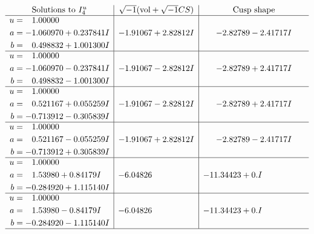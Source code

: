 \documentclass[1p]{elsarticle_modified}
\theoremstyle{definition}
\newcommand{\I}{\sqrt{-1}}
\begin{document}
$$\begin{array}{c|c|c}  
\text{Solutions to }I^u_{4}& \I (\text{vol} + \sqrt{-1}CS) & \text{Cusp shape}\\
 \hline 
\begin{aligned}
u &= \phantom{-}1.00000\phantom{ +0.000000I} \\
a &= -1.060970 + 0.237841 I \\
b &= \phantom{-}0.498832 + 1.001300 I\end{aligned}
 & -1.91067 + 2.82812 I & -2.82789 - 2.41717 I \\ \hline\begin{aligned}
u &= \phantom{-}1.00000\phantom{ +0.000000I} \\
a &= -1.060970 - 0.237841 I \\
b &= \phantom{-}0.498832 - 1.001300 I\end{aligned}
 & -1.91067 - 2.82812 I & -2.82789 + 2.41717 I \\ \hline\begin{aligned}
u &= \phantom{-}1.00000\phantom{ +0.000000I} \\
a &= \phantom{-}0.521167 + 0.055259 I \\
b &= -0.713912 - 0.305839 I\end{aligned}
 & -1.91067 - 2.82812 I & -2.82789 + 2.41717 I \\ \hline\begin{aligned}
u &= \phantom{-}1.00000\phantom{ +0.000000I} \\
a &= \phantom{-}0.521167 - 0.055259 I \\
b &= -0.713912 + 0.305839 I\end{aligned}
 & -1.91067 + 2.82812 I & -2.82789 - 2.41717 I \\ \hline\begin{aligned}
u &= \phantom{-}1.00000\phantom{ +0.000000I} \\
a &= \phantom{-}1.53980 + 0.84179 I \\
b &= -0.284920 + 1.115140 I\end{aligned}
 & -6.04826\phantom{ +0.000000I} & -11.34423 + 0. I\phantom{ +0.000000I} \\ \hline\begin{aligned}
u &= \phantom{-}1.00000\phantom{ +0.000000I} \\
a &= \phantom{-}1.53980 - 0.84179 I \\
b &= -0.284920 - 1.115140 I\end{aligned}
 & -6.04826\phantom{ +0.000000I} & -11.34423 + 0. I\phantom{ +0.000000I}\\
 \hline 
 \end{array}$$\newpage\newpage\renewcommand{\arraystretch}{1}
\end{document}
